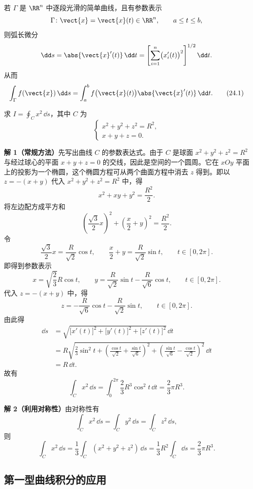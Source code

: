 若 $\Gamma$ 是 $\RR^n$ 中逐段光滑的简单曲线，且有参数表示
\[
  \Gamma\colon \vect{x}=\vect{x}(t)\in\RR^n,\qquad a\le t\le b,
\]
则弧长微分
\[
  \dd s=\abs{\vect{x}'(t)}\,\dd t=\left[\sum_{i=1}^n\bigl(x_i'(t)\bigr)^2\right]^{1/2}\dd t.
\]
从而
\begin{equation}
  \int_\Gamma f(\vect{x})\,\dd s=\int_a^b f\bigl(\vect{x}(t)\bigr)\abs{\vect{x}'(t)}\,\dd t.
  \tag{24.1}
  \label{eq:24.1}
\end{equation}

\begin{xexample}[24.1.1]
求 $I=\oint_C x^2\,\dd s$，其中 $C$ 为
\[
  \begin{cases}
    x^2+y^2+z^2=R^2,\\
    x+y+z=0.
  \end{cases}
\]
\end{xexample}
\begin{xsolution}
\textbf{解 1（常规方法）}\quad 先写出曲线 $C$ 的参数表达式。由于 $C$ 是球面 $x^2+y^2+z^2=R^2$ 与经过球心的平面 $x+y+z=0$ 的交线，因此是空间的一个圆周。它在 $xOy$ 平面上的投影为一个椭圆，这个椭圆方程可从两个曲面方程中消去 $z$ 得到。即以 $z=-(x+y)$ 代入 $x^2+y^2+z^2=R^2$ 中，得
\[
  x^2+xy+y^2=\frac{R^2}{2}.
\]
将左边配方成平方和
\[
  \left(\frac{\sqrt3}{2}x\right)^2+\left(\frac{x}{2}+y\right)^2=\frac{R^2}{2}.
\]
令
\[
  \frac{\sqrt3}{2}x=\frac{R}{\sqrt2}\cos t,\qquad \frac{x}{2}+y=\frac{R}{\sqrt2}\sin t,\qquad t\in[0,2\pi].
\]
即得到参数表示
\[
  x=\sqrt{\frac23}R\cos t,\qquad y=\frac{R}{\sqrt2}\sin t-\frac{R}{\sqrt6}\cos t,\qquad t\in[0,2\pi].
\]
代入 $z=-(x+y)$ 中，得
\[
  z=-\frac{R}{\sqrt6}\cos t-\frac{R}{\sqrt2}\sin t,\qquad t\in[0,2\pi].
\]
由此得
\begin{align*}
  \dd s&=\sqrt{\bigl[x'(t)\bigr]^2+\bigl[y'(t)\bigr]^2+\bigl[z'(t)\bigr]^2}\,\dd t\\
  &=R\sqrt{\frac23\sin^2t+\left(\frac{\cos t}{\sqrt2}+\frac{\sin t}{\sqrt6}\right)^2+\left(\frac{\sin t}{\sqrt6}-\frac{\cos t}{\sqrt2}\right)^2}\,\dd t\\
  &=R\,\dd t.
\end{align*}
故有
\[
  \int_Cx^2\,\dd s=\int_0^{2\pi}\frac23R^3\cos^2t\,\dd t=\frac23\pi R^3.
\]

\textbf{解 2（利用对称性）}\quad 由对称性有
\[
  \int_Cx^2\,\dd s=\int_Cy^2\,\dd s=\int_Cz^2\,\dd s,
\]
则
\[
  \int_Cx^2\,\dd s=\frac13\int_C(x^2+y^2+z^2)\,\dd s=\frac13R^2\int_C\dd s=\frac23\pi R^3.
\]
\end{xsolution}

\subsection{第一型曲线积分的应用}

